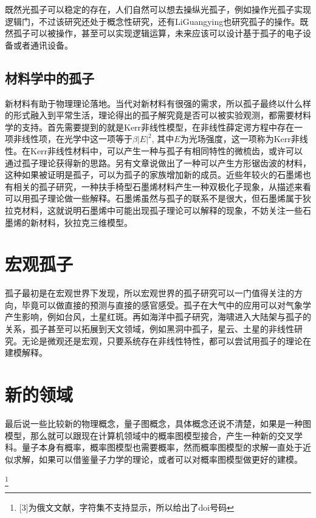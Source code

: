 \documentclass{article}
\begin{document}
\begin{multicols}{2}
既然光孤子可以稳定的存在，人们自然可以想去操纵光孤子，例如操作光孤子实现逻辑门\cite{jandieri2020functional}，不过该研究还处于概念性研究，还有LiGuangying也研究孤子的操作\cite{li2020dissipative}。既然孤子可以被操作，甚至可以实现逻辑运算，未来应该可以设计基于孤子的电子设备或者通讯设备。
\subsection{材料学中的孤子}
  新材料有助于物理理论落地。当代对新材料有很强的需求，所以孤子最终以什么样的形式融入到平常生活，理论得出的孤子解究竟是否可以被实验观测，都需要材料学的支持。首先需要提到的就是Kerr非线性模型，在非线性薛定谔方程中存在一项非线性项，在光学中这一项等于$\beta|E|^2$, 其中$E$为光场强度，这一项称为Kerr非线性。在Kerr非线性材料中，可以产生一种与孤子有相同特性的微梳齿\cite{turitsyn2019nonlinear}，或许可以通过孤子理论获得新的思路。另有文章说做出了一种可以产生方形锯齿波的材料\cite{article_kerr}，这种如果被证明是孤子，可以为孤子的家族增加新的成员。近些年较火的石墨烯也有相关的孤子研究，一种扶手椅型石墨烯材料产生一种双极化子现象\cite{abreu2019stability}，从描述来看可以用孤子理论做一些解释。石墨烯虽然与孤子的联系不是很大，但石墨烯属于狄拉克材料，这就说明石墨烯中可能出现孤子理论可以解释的现象，不妨关注一些石墨烯的新材料，狄拉克三维模型\cite{ooi2020dirac}。
\section{宏观孤子}
孤子最初是在宏观世界下发现，所以宏观世界的孤子研究可以一门值得关注的方向，毕竟可以做直接的预测与直接的感官感受。孤子在大气中的应用可以对气象学产生影响，例如台风，土星红斑。再如海洋中孤子研究\cite{stepanyants2020nonlinear}，海啸进入大陆架与孤子的关系\cite{zhao2019the}，孤子甚至可以拓展到天文领域，例如黑洞中孤子\cite{dymnikova2020regular}，星云、土星的非线性研究\cite{ludu2019rotating}。无论是微观还是宏观，只要系统存在非线性特性，都可以尝试用孤子的理论在建模解释。

\section{新的领域}
最后说一些比较新的物理概念，量子图概念\cite{sabirov2020dynamics}，具体概念还说不清楚，如果是一种图模型，那么就可以跟现在计算机领域中的概率图模型接合，产生一种新的交叉学科。量子本身有概率，概率图模型也需要概率，然而概率图模型的求解一直处于近似求解，如果可以借鉴量子力学的理论，或者可以对概率图模型做更好的建模。
\end{multicols}

%


\footnote{[3]为俄文文献，字符集不支持显示，所以给出了doi号码} 
\end{document}
